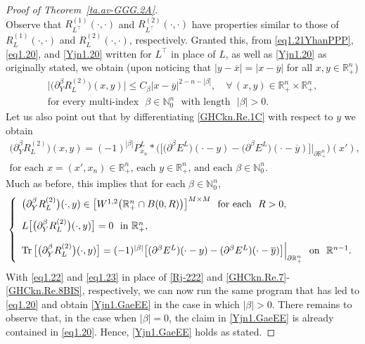 \documentclass[11pt,reqno]{amsart}
\numberwithin{equation}{section}
\theoremstyle{remark}
\begin{document}
\begin{proof}[Proof of Theorem~\ref{ta.av-GGG.2A}]
\begin{equation}
\end{equation}
%
Observe that $R^{(1)}_{L^\top}(\cdot,\cdot)$ and $R^{(2)}_{L^\top}(\cdot,\cdot)$
have properties similar to those of $R^{(1)}_{L}(\cdot,\cdot)$ and $R^{(2)}_{L}(\cdot,\cdot)$, 
respectively. Granted this, from \eqref{eq1.21YhanPPP}, \eqref{eq1.20}, and \eqref{Yjn1.20} written 
for $L^\top$ in place of $L$, as well as \eqref{Yjn1.20} as originally stated, we obtain 
(upon noticing that $|y-\overline{x}|=|x-\overline{y}|$ for all $x,y\in\mathbb{R}^n_+$)
%
\begin{equation}\label{eq1.22}
\begin{array}{c}
\big|\big(\partial^\beta_Y R^{(2)}_L\big)(x,y)\big|
\leq C_\beta|x-\overline{y}|^{2-n-|\beta|},
\quad\forall\,(x,y)\in{\mathbb{R}}^n_{+}\times{\mathbb{R}}^n_{+},
\\[6pt]
\text{for every multi-index }\,\,\beta\in\mathbb{N}_0^n\,\,
\text{ with length }\,\,|\beta|>0.
\end{array}
\end{equation}
%
Let us also point out that by differentiating
\eqref{GHCkn.Re.1C} with respect to $y$ we obtain
%
\begin{equation}\label{GHCkn.Re.1BcD}
\begin{array}{c}
\big(\partial^\beta_Y R^{(2)}_L\big)(x,y)=(-1)^{|\beta|}
P^L_{x_n}\ast\Big(\big[\big(\partial^\beta E^L\big)(\cdot-y)
-\big(\partial^\beta E^L\big)(\cdot-\overline{y})\big]
\big|_{\partial{\mathbb{R}}^n_{+}}\Big)(x'),
\\[10pt]
\text{for each $x=(x',x_n)\in{\mathbb{R}}^n_{+}$, each   
$y\in{\mathbb{R}}^n_{+}$, and each $\beta\in{\mathbb{N}}_0^n$}.
\end{array}
\end{equation}
%
Much as before, this implies that for each $\beta\in{\mathbb{N}}_0^n$,
%
\begin{equation}\label{eq1.23}
\left\{
\begin{array}{l}
\big(\partial^\beta_Y R^{(2)}_L\big)(\cdot,y)\in\big[W^{1,2}\big({\mathbb{R}}^n_{+}\cap B(0,R)\big)\big]^{M\times M}
\,\,\text{ for each }\,\,R>0,
\\[8pt]
L\big[\big(\partial^\beta_Y R^{(2)}_L\big)(\cdot,y)\big]=0
\,\,\text{ in }\mathbb{R}^n_{+},
\\[10pt]
{\rm Tr}\,\big[\big(\partial^\beta_Y R^{(2)}_L\big)(\cdot,y)\big]
=(-1)^{|\beta|}\big[(\partial^\beta E^L)(\cdot-y)
-(\partial^\beta E^L)(\cdot-\overline{y})\big]\Big|_{\partial{\mathbb{R}}^n_{+}}
\,\,\text{ on }\,\,\mathbb{R}^{n-1}.
\end{array}
\right.
\end{equation}
%
With \eqref{eq1.22} and \eqref{eq1.23} in place of \eqref{Rj-222}
and \eqref{GHCkn.Re.7}-\eqref{GHCkn.Re.8BIS}, respectively, 
we can now run the same program that has led to \eqref{eq1.20}
and obtain \eqref{Yjn1.GaeEE} in the case in which $|\beta|>0$.
There remains to observe that, in the case when $|\beta|=0$, 
the claim in \eqref{Yjn1.GaeEE} is already contained in \eqref{eq1.20}.
Hence, \eqref{Yjn1.GaeEE} holds as stated.



\end{proof}
\end{document}
